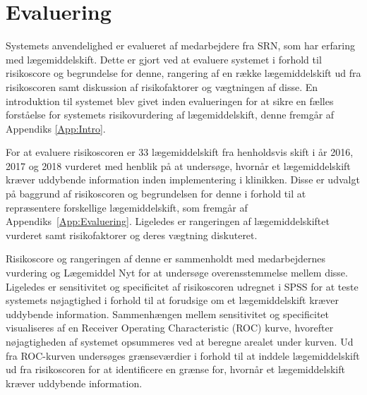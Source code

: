 \section{Evaluering}
Systemets anvendelighed er evalueret af medarbejdere fra SRN, som har erfaring med lægemiddelskift. Dette er gjort ved at evaluere systemet i forhold til risikoscore og begrundelse for denne, rangering af en række lægemiddelskift ud fra risikoscoren samt diskussion af risikofaktorer og vægtningen af disse. En introduktion til systemet blev givet inden evalueringen for at sikre en fælles forståelse for systemets risikovurdering af lægemiddelskift, denne fremgår af Appendiks \ref{App:Intro}. 

For at evaluere risikoscoren er 33 lægemiddelskift fra henholdsvis skift i år 2016, 2017 og 2018 vurderet med henblik på at undersøge, hvornår et lægemiddelskift kræver uddybende information inden implementering i klinikken. Disse er udvalgt på baggrund af risikoscoren og begrundelsen for denne i forhold til at repræsentere forskellige lægemiddelskift, som fremgår af Appendiks~\ref{App:Evaluering}. Ligeledes er rangeringen af lægemiddelskiftet vurderet samt risikofaktorer og deres vægtning diskuteret. 

Risikoscore og rangeringen af denne er sammenholdt med medarbejdernes vurdering og Lægemiddel Nyt for at undersøge overensstemmelse mellem disse. Ligeledes er sensitivitet og specificitet af risikoscoren udregnet i SPSS for at teste systemets nøjagtighed i forhold til at forudsige om et lægemiddelskift kræver uddybende information. Sammenhængen mellem sensitivitet og specificitet visualiseres af en Receiver Operating Characteristic (ROC) kurve, hvorefter nøjagtigheden af systemet opsummeres ved at beregne arealet under kurven. Ud fra ROC-kurven undersøges grænseværdier i forhold til at inddele lægemiddelskift ud fra risikoscoren for at identificere en grænse for, hvornår et lægemiddelskift kræver uddybende information.



